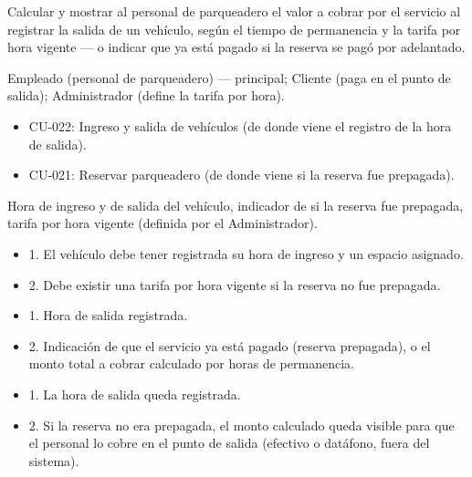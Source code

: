 \begin{description}[leftmargin=!, labelwidth=3.4cm, style=nextline, topsep=3pt]
\item[Objetivo] Calcular y mostrar al personal de parqueadero el valor a cobrar por el servicio al registrar la salida de un vehículo, según el tiempo de permanencia y la tarifa por hora vigente — o indicar que ya está pagado si la reserva se pagó por adelantado.

\item[Actores] Empleado (personal de parqueadero) — principal; Cliente (paga en el punto de salida); Administrador (define la tarifa por hora).

\item[CU relacionados] \hfill
\begin{itemize}[leftmargin=1.2em, topsep=1pt]
  \item CU-022: Ingreso y salida de vehículos (de donde viene el registro de la hora de salida).
  \item CU-021: Reservar parqueadero (de donde viene si la reserva fue prepagada).
\end{itemize}

\item[Entradas] Hora de ingreso y de salida del vehículo, indicador de si la reserva fue prepagada, tarifa por hora vigente (definida por el Administrador).

\item[Pre-condiciones] \hfill
\begin{itemize}[leftmargin=1.2em, topsep=1pt]
  \item 1. El vehículo debe tener registrada su hora de ingreso y un espacio asignado.
  \item 2. Debe existir una tarifa por hora vigente si la reserva no fue prepagada.
\end{itemize}

\item[Salidas] \hfill
\begin{itemize}[leftmargin=1.2em, topsep=1pt]
  \item 1. Hora de salida registrada.
  \item 2. Indicación de que el servicio ya está pagado (reserva prepagada), o el monto total a cobrar calculado por horas de permanencia.
\end{itemize}

\item[Post-condiciones] \hfill
\begin{itemize}[leftmargin=1.2em, topsep=1pt]
  \item 1. La hora de salida queda registrada.
  \item 2. Si la reserva no era prepagada, el monto calculado queda visible para que el personal lo cobre en el punto de salida (efectivo o datáfono, fuera del sistema).
\end{itemize}

\end{description}

